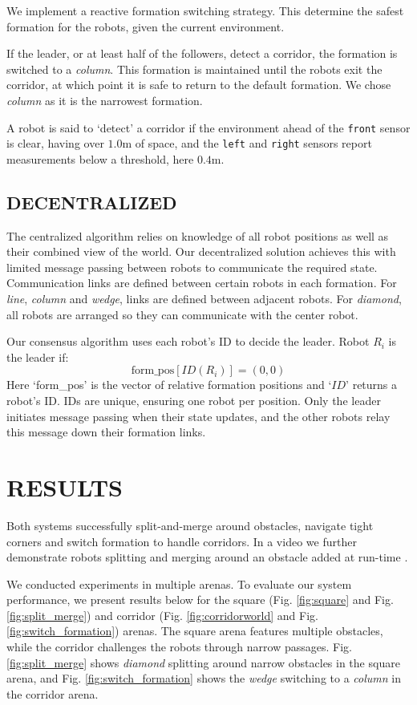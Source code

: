 \documentclass[letterpaper, 10 pt, conference]{ieeeconf}  %
\begin{document}
We implement a reactive formation switching strategy. This determine the safest formation for the robots, given the current environment.

If the leader, or at least half of the followers, detect a corridor, the formation is switched to a \textit{column}. This formation is maintained until the robots exit the corridor, at which point it is safe to return to the default formation. We chose \textit{column} as it is the narrowest formation.

A robot is said to `detect' a corridor if the environment ahead of the \texttt{front} sensor is clear, having over $1.0$m of space, and the \texttt{left} and \texttt{right} sensors report measurements below a threshold, here $0.4$m.

\subsection{DECENTRALIZED}

The centralized algorithm relies on knowledge of all robot positions as well as their combined view of the world. Our decentralized solution achieves this with limited message passing between robots to communicate the required state. Communication links are defined between certain robots in each formation. For \textit{line}, \textit{column} and \textit{wedge}, links are defined between adjacent robots. For \textit{diamond}, all robots are arranged so they can communicate with the center robot.

Our consensus algorithm uses each robot's ID to decide the leader. Robot $R_i$ is the leader if:
\[\text{form\_pos}[ID(R_i)] = (0,0)\]
Here `form\_pos' is the vector of relative formation positions and `$ID$' returns a robot's ID. IDs are unique, ensuring one robot per position. Only the leader initiates message passing when their state updates, and the other robots relay this message down their formation links.

\section{RESULTS}

Both systems successfully split-and-merge around obstacles, navigate tight corners and switch formation to handle corridors. In a video we further demonstrate robots splitting and merging around an obstacle added at run-time \cite{repository}. 

We conducted experiments in multiple arenas. To evaluate our system performance, we present results below for the square (Fig. \ref{fig:square} and Fig. \ref{fig:split_merge}) and corridor (Fig. \ref{fig:corridorworld} and Fig. \ref{fig:switch_formation}) arenas. The square arena features multiple obstacles, while the corridor challenges the robots through narrow passages. Fig. \ref{fig:split_merge} shows \textit{diamond} splitting around narrow obstacles in the square arena, and Fig. \ref{fig:switch_formation} shows the \textit{wedge} switching to a \textit{column} in the corridor arena.
\end{document}
